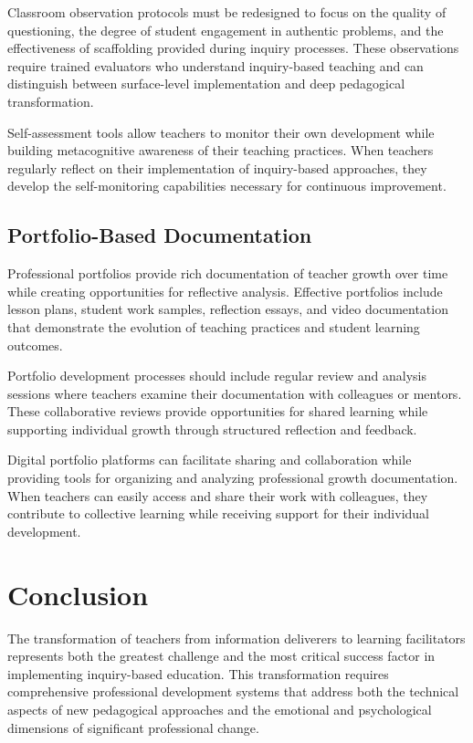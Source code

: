 \documentclass[
  Letterpaper,
]{scrbook}
\begin{document}
Classroom observation protocols must be redesigned to focus on the
quality of questioning, the degree of student engagement in authentic
problems, and the effectiveness of scaffolding provided during inquiry
processes. These observations require trained evaluators who understand
inquiry-based teaching and can distinguish between surface-level
implementation and deep pedagogical transformation.

Self-assessment tools allow teachers to monitor their own development
while building metacognitive awareness of their teaching practices. When
teachers regularly reflect on their implementation of inquiry-based
approaches, they develop the self-monitoring capabilities necessary for
continuous improvement.

\subsection{Portfolio-Based
Documentation}\label{portfolio-based-documentation}

Professional portfolios provide rich documentation of teacher growth
over time while creating opportunities for reflective analysis.
Effective portfolios include lesson plans, student work samples,
reflection essays, and video documentation that demonstrate the
evolution of teaching practices and student learning outcomes.

Portfolio development processes should include regular review and
analysis sessions where teachers examine their documentation with
colleagues or mentors. These collaborative reviews provide opportunities
for shared learning while supporting individual growth through
structured reflection and feedback.

Digital portfolio platforms can facilitate sharing and collaboration
while providing tools for organizing and analyzing professional growth
documentation. When teachers can easily access and share their work with
colleagues, they contribute to collective learning while receiving
support for their individual development.

\section{Conclusion}\label{conclusion-4}

The transformation of teachers from information deliverers to learning
facilitators represents both the greatest challenge and the most
critical success factor in implementing inquiry-based education. This
transformation requires comprehensive professional development systems
that address both the technical aspects of new pedagogical approaches
and the emotional and psychological dimensions of significant
professional change.
\end{document}

